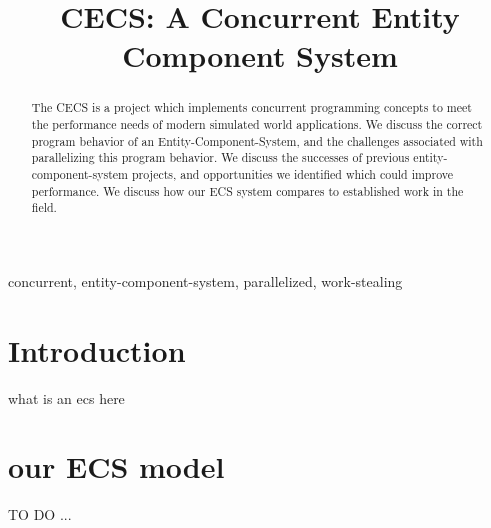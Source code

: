 \documentclass[conference]{IEEEtran}
\begin{document}
\title{CECS: A Concurrent Entity Component System}

\author{
\and
{}
\and
{}
}

\maketitle

\begin{abstract}
The CECS is a project which implements concurrent programming concepts
to meet the performance needs of modern simulated world applications. We discuss 
the correct program behavior of an Entity-Component-System, and the challenges
associated with parallelizing this program behavior. We discuss the successes 
of previous entity-component-system projects, and opportunities we identified which could improve performance. We discuss how our ECS system compares to established work in the field. 
\end{abstract}

\begin{IEEEkeywords}
concurrent, entity-component-system, parallelized, work-stealing
\end{IEEEkeywords}

\section{Introduction}
what is an ecs here

\section{our ECS model}
TO DO
...
\end{document}
